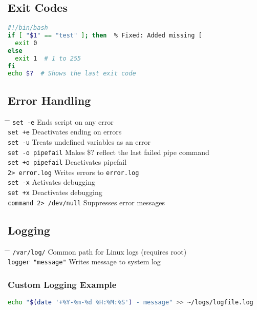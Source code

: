 \documentclass[a4paper,10pt]{article}
\begin{document}
\subsection{Exit Codes}
\begin{lstlisting}[language=bash]
#!/bin/bash
if [ "$1" == "test" ]; then  % Fixed: Added missing [
  exit 0 
else 
  exit 1  # 1 to 255
fi
echo $?  # Shows the last exit code
\end{lstlisting}

\subsection{Error Handling}
\begin{tabbing}
	\= \hspace{30mm} \= \hspace{50mm} \kill
	\> \verb|set -e| \> Ends script on any error \\
	\> \verb|set +e| \> Deactivates ending on errors \\
	\> \verb|set -u| \> Treats undefined variables as an error \\
	\> \verb|set -o pipefail| \> Makes \$? reflect the last failed pipe command \\
	\> \verb|set +o pipefail| \> Deactivates pipefail \\
	\> \verb|2> error.log| \> Writes errors to \verb|error.log| \\
	\> \verb|set -x| \> Activates debugging \\
	\> \verb|set +x| \> Deactivates debugging \\
	\> \verb|command 2> /dev/null| \> Suppresses error messages \\
\end{tabbing}

\subsection{Logging}
\begin{tabbing}
	\= \hspace{30mm} \= \hspace{50mm} \kill
	\> \verb|/var/log/| \> Common path for Linux logs (requires root) \\
	\> \verb|logger "message"| \> Writes message to system log \\
\end{tabbing}

\subsubsection*{Custom Logging Example}
\begin{lstlisting}[language=bash]
echo "$(date '+%Y-%m-%d %H:%M:%S') - message" >> ~/logs/logfile.log
\end{lstlisting}
\end{document}

